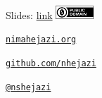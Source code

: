 \documentclass[12pt,t]{beamer}
\begin{document}
\begin{frame}[c]{}

\Large
Slides: \href{http://bit.ly/biotmle2017_wnotes}{link} \quad
\includegraphics[height=5mm]{Figs/cc-zero.png}

\vspace{10mm}

\href{http://nimahejazi.org}{\tt nimahejazi.org}

\vspace{10mm}

\href{https://github.com/nhejazi}{\tt github.com/nhejazi}

\vspace{10mm}

\href{https://twitter.com/nshejazi}{\tt @nshejazi}


\end{frame}
\end{document}
